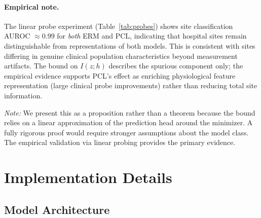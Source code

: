 \documentclass{article}
\begin{document}
\paragraph{Empirical note.} The linear probe experiment (Table~\ref{tab:probes}) shows site classification AUROC $\approx 0.99$ for \emph{both} ERM and PCL, indicating that hospital sites remain distinguishable from representations of both models. This is consistent with sites differing in genuine clinical population characteristics beyond measurement artifacts. The bound on $I(z;h)$ describes the spurious component only; the empirical evidence supports PCL's effect as enriching physiological feature representation (large clinical probe improvements) rather than reducing total site information.

\textit{Note:} We present this as a proposition rather than a theorem because the bound relies on a linear approximation of the prediction head around the minimizer. A fully rigorous proof would require stronger assumptions about the model class. The empirical validation via linear probing provides the primary evidence.

\section{Implementation Details}
\label{app:implementation}

\subsection{Model Architecture}
\end{document}
